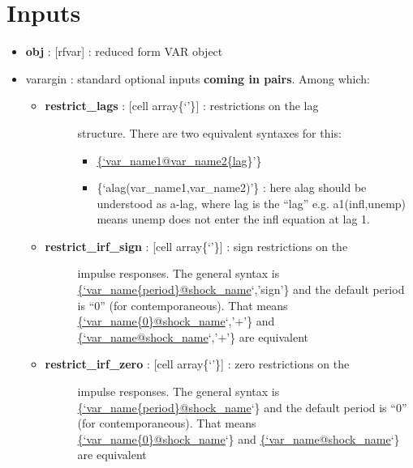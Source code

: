 \documentclass[letterpaper,10pt,english]{sphinxmanual}
\begin{document}
\section{Inputs}
\label{classes/models/@rfvar/rfvar:id144}\begin{itemize}
\item {} 
\textbf{obj} : {[}rfvar{]} : reduced form VAR object

\item {} 
varargin : standard optional inputs \textbf{coming in pairs}. Among which:
\begin{itemize}
\item {} \begin{description}
\item[{\textbf{restrict\_lags} : {[}cell array\textbar{}\{`'\}{]} : restrictions on the lag}] \leavevmode
structure. There are two equivalent syntaxes for this:
\begin{itemize}
\item {} 
\href{mailto:\{'var\_name1@var\_name2\{lag}{\{`var\_name1@var\_name2\{lag}\}'\}

\item {} 
\{`alag(var\_name1,var\_name2)'\} : here alag should be understood as
a-lag, where lag is the ``lag'' e.g. a1(infl,unemp) means unemp
does not enter the infl equation at lag 1.

\end{itemize}

\end{description}

\item {} \begin{description}
\item[{\textbf{restrict\_irf\_sign} : {[}cell array\textbar{}\{`'\}{]} : sign restrictions on the}] \leavevmode
impulse responses. The general syntax is
\href{mailto:\{'var\_name\{period\}@shock\_name}{\{`var\_name\{period\}@shock\_name}`,'sign'\} and the default period is
``0'' (for contemporaneous). That means
\href{mailto:\{'var\_name\{0\}@shock\_name}{\{`var\_name\{0\}@shock\_name}`,'+'\} and \href{mailto:\{'var\_name@shock\_name}{\{`var\_name@shock\_name}`,'+'\}
are equivalent

\end{description}

\item {} \begin{description}
\item[{\textbf{restrict\_irf\_zero} : {[}cell array\textbar{}\{`'\}{]} : zero restrictions on the}] \leavevmode
impulse responses. The general syntax is
\href{mailto:\{'var\_name\{period\}@shock\_name}{\{`var\_name\{period\}@shock\_name}`\} and the default period is
``0'' (for contemporaneous). That means
\href{mailto:\{'var\_name\{0\}@shock\_name}{\{`var\_name\{0\}@shock\_name}`\} and \href{mailto:\{'var\_name@shock\_name}{\{`var\_name@shock\_name}`\}
are equivalent


\end{description}
\end{itemize}
\end{itemize}
\end{document}
